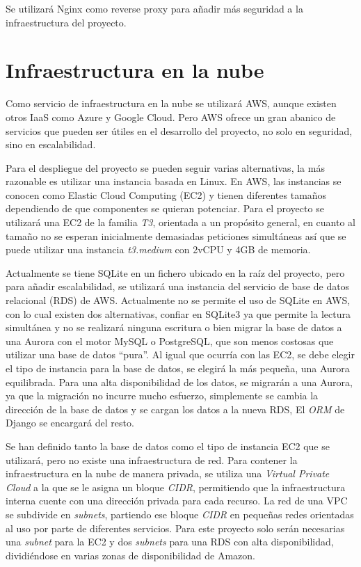 Se utilizará Nginx como reverse proxy para añadir más seguridad a la infraestructura del proyecto.

\section{Infraestructura en la nube}
Como servicio de infraestructura en la nube se utilizará AWS, aunque existen otros IaaS como Azure y Google Cloud. Pero AWS ofrece un gran abanico de servicios que pueden ser útiles en el desarrollo del proyecto, no solo en seguridad, sino en escalabilidad. 

Para el despliegue del proyecto se pueden seguir varias alternativas, la más razonable es utilizar una instancia basada en Linux. En AWS, las instancias se conocen como Elastic Cloud Computing (EC2) y tienen diferentes tamaños dependiendo de que componentes se quieran potenciar. Para el proyecto se utilizará una EC2 de la familia \textit{T3}, orientada a un propósito general, en cuanto al tamaño no se esperan inicialmente demasiadas peticiones simultáneas así que se puede utilizar una instancia \textit{t3.medium} con 2vCPU y 4GB de memoria.

Actualmente se tiene SQLite en un fichero ubicado en la raíz del proyecto, pero para añadir escalabilidad, se utilizará una instancia del servicio de base de datos relacional (RDS) de AWS. Actualmente no se permite el uso de SQLite en AWS, con lo cual existen dos alternativas, confiar en SQLite3 ya que permite la lectura simultánea y no se realizará ninguna escritura o bien migrar la base de datos a una Aurora con el motor MySQL o PostgreSQL, que son menos costosas que utilizar una base de datos ``pura''. Al igual que ocurría con las EC2, se debe elegir el tipo de instancia para la base de datos, se elegirá la más pequeña, una Aurora equilibrada. Para una alta disponibilidad de los datos, se migrarán a una Aurora, ya que la migración no incurre mucho esfuerzo, simplemente se cambia la dirección de la base de datos y se cargan los datos a la nueva RDS, El \textit{ORM} de Django se encargará del resto.

Se han definido tanto la base de datos como el tipo de instancia EC2 que se utilizará, pero no existe una infraestructura de red. Para contener la infraestructura en la nube de manera privada, se utiliza una \textit{Virtual Private Cloud} a la que se le asigna un bloque \textit{CIDR}, permitiendo que la infraestructura interna cuente con una dirección privada para cada recurso. La red de una VPC se subdivide en \textit{subnets}, partiendo ese bloque \textit{CIDR} en pequeñas redes orientadas al uso por parte de diferentes servicios. Para este proyecto solo serán necesarias una \textit{subnet} para la EC2 y dos \textit{subnets} para una RDS con alta disponibilidad, dividiéndose en varias zonas de disponibilidad de Amazon. 

